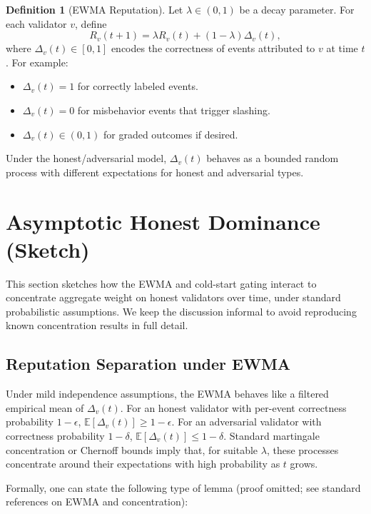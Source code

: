 \documentclass[11pt]{article}
\theoremstyle{plain}
\theoremstyle{definition}
\newtheorem{definition}{Definition}
\begin{document}
\begin{definition}[EWMA Reputation]
Let \(\lambda \in (0,1)\) be a decay parameter. For each validator \(v\), define
\[
R_v(t+1) = \lambda R_v(t) + (1-\lambda)\Delta_v(t),
\]
where \(\Delta_v(t) \in [0,1]\) encodes the correctness of events attributed to \(v\) at time \(t\). For example:
\begin{itemize}[leftmargin=*]
  \item \(\Delta_v(t) = 1\) for correctly labeled events.
  \item \(\Delta_v(t) = 0\) for misbehavior events that trigger slashing.
  \item \(\Delta_v(t) \in (0,1)\) for graded outcomes if desired.
\end{itemize}
\end{definition}

Under the honest/adversarial model, \(\Delta_v(t)\) behaves as a bounded random process with different expectations for honest and adversarial types.

\section{Asymptotic Honest Dominance (Sketch)}

This section sketches how the EWMA and cold-start gating interact to concentrate aggregate weight on honest validators over time, under standard probabilistic assumptions. We keep the discussion informal to avoid reproducing known concentration results in full detail.

\subsection{Reputation Separation under EWMA}

Under mild independence assumptions, the EWMA behaves like a filtered empirical mean of \(\Delta_v(t)\). For an honest validator with per-event correctness probability \(1-\epsilon\), \(\mathbb{E}[\Delta_v(t)] \ge 1-\epsilon\). For an adversarial validator with correctness probability \(1-\delta\), \(\mathbb{E}[\Delta_v(t)] \le 1-\delta\). Standard martingale concentration or Chernoff bounds imply that, for suitable \(\lambda\), these processes concentrate around their expectations with high probability as \(t\) grows.

Formally, one can state the following type of lemma (proof omitted; see standard references on EWMA and concentration):
\end{document}
